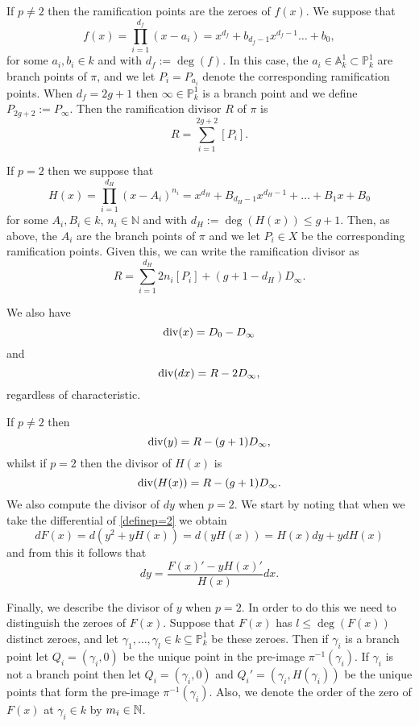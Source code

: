 If $p \neq 2$ then the ramification points are the zeroes of $f(x)$.
We suppose that 
    \[
    f(x) = \prod_{i=1}^{d_f} (x-a_i) = x^{d_f} + b_{d_f - 1}x^{d_f-1} \ldots + b_0,
    \]
for some $a_i, b_i \in k$ and with $d_f := \deg(f) $.
In this case, the $a_i \in \mathbb A_k^1 \subset \mathbb P_k^1$ are branch points of $\pi$, and we let $P_i = P_{a_i}$ denote the corresponding ramification points.
When $d_f = 2g+1$ then $\infty \in \mathbb P_k^1$ is a branch point and we define $P_{2g+2} := P_\infty$.
Then the ramification divisor $R$ of $\pi$ is
\[
R = \sum_{i=1}^{2g+2} [P_i] .
\]

If $p=2$ then we suppose that
\begin{equation}\label{capitalh}
H(x) = \prod_{i=1}^{d_H} (x-A_i)^{n_i} = x^{d_H} + B_{{d_H}-1}x^{{d_H}-1} + \ldots + B_1x + B_0
\end{equation}
for some $A_i, B_i \in  k$, $n_i \in \mathbb N$ and with  ${d_H} := \deg(H(x)) \leq g+1$.
Then, as above, the $A_i$ are the branch points of $\pi$ and we let $P_i \in X$ be the corresponding ramification points.
Given this, we can write the ramification divisor as
    \[
    R = \sum_{i=1}^{d_H} 2n_i[P_i] + (g+1-{d_H})D_\infty.
    \]


We also have
    \begin{equation}\label{divxp=2}
    \operatorname{div} (x)  = D_0 - D_\infty
    \end{equation}
and
    \begin{equation}\label{differentialdivisor}
    \operatorname{div}(dx) = R - 2D_\infty,
    \end{equation}
regardless of characteristic.

If $p \neq 2$ then 
    \begin{equation}\label{pnot2divisors}
    \operatorname{div}(y)  = R - (g+1)D_\infty,
    \end{equation}
whilst if $p=2$ then the divisor of $H(x)$ is
    \begin{equation}\label{divisorofH}
    \operatorname{div} (H(x))  = R - (g+1)D_\infty. 
    \end{equation}
We also compute the divisor of $dy$ when $p=2$.
We start by noting that when we take the differential of \eqref{definep=2} we obtain
    \[
    dF(x) = d\left(y^2 + yH(x) \right) = d(yH(x)) = H(x)dy + ydH(x)
    \]
and from this it follows that
    \begin{equation}\label{divdyp=2}
    dy = \frac{F(x)'-yH(x)'}{H(x)}dx.
    \end{equation}

Finally, we describe the divisor of $y$ when $p=2$.
In order to do this we need to distinguish the zeroes of $F(x)$.
Suppose that $F(x)$ has $l \leq \deg(F(x))$ distinct zeroes, and let $\gamma_1, \ldots, \gamma_l \in k \subseteq \mathbb P_k^1$ be these zeroes.
Then if $\gamma_i$ is a branch point let $Q_i = (\gamma_i, 0)$ be the unique point in the pre-image $\pi^{-1}(\gamma_i)$.
If $\gamma_i$ is not a branch point then let $Q_i = (\gamma_i, 0)$ and $Q_i' = (\gamma_i, H(\gamma_i))$ be the unique points that form the pre-image $\pi^{-1}(\gamma_i)$.
Also, we denote the order of the zero of $F(x)$ at $\gamma_i \in k$ by $m_i \in {\mathbb N}$.


